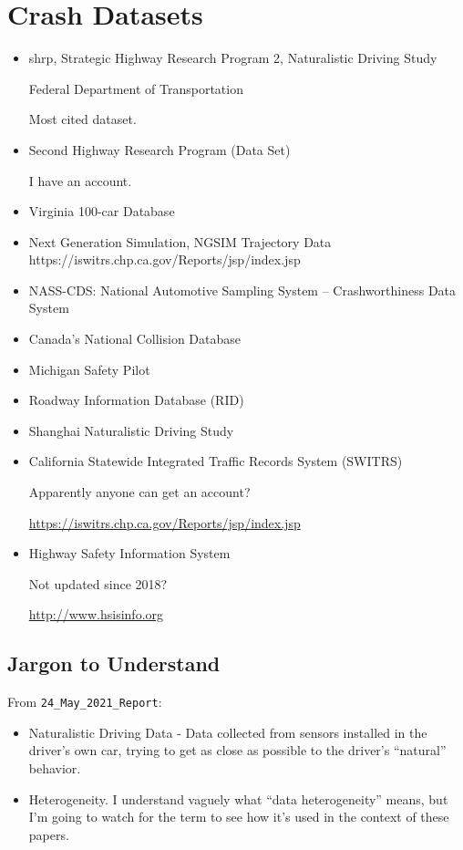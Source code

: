\section{Crash Datasets}


\begin{itemize}
	\item \acrshort{shrp},  Strategic Highway Research Program 2, Naturalistic Driving Study
	
	Federal Department of Transportation
	
	Most cited dataset.  
	
	\item Second Highway Research Program (Data Set)
	
	I have an account.  
	\item Virginia 100-car Database 
	\item Next Generation Simulation, NGSIM Trajectory Data
	https://iswitrs.chp.ca.gov/Reports/jsp/index.jsp
	\item NASS-CDS:  National Automotive Sampling System – Crashworthiness Data System
	\item Canada's National Collision Database
	\item Michigan Safety Pilot
	\item Roadway Information Database (RID)
	\item Shanghai Naturalistic Driving Study	
	\item California Statewide Integrated Traffic Records System (SWITRS)
	
	Apparently anyone can get an account?
	
	\url{https://iswitrs.chp.ca.gov/Reports/jsp/index.jsp}
	\item Highway Safety Information System
	
	Not updated since 2018?
	
	\url{http://www.hsisinfo.org}
\end{itemize}

\subsection{Jargon to Understand}

From \verb|24_May_2021_Report|:

\begin{itemize}
	\item Naturalistic Driving Data - Data collected from sensors installed in the driver's own car, trying to get as close as possible to the driver's ``natural'' behavior. 
	\item Heterogeneity.  I understand vaguely what ``data heterogeneity'' means, but I'm going to watch for the term to see how it's used in the context of these papers.  
\end{itemize}

